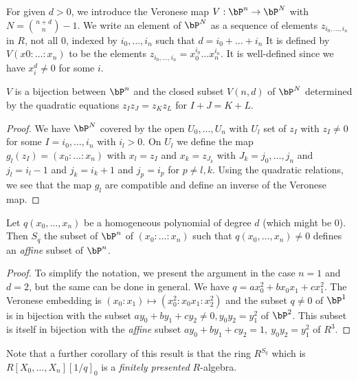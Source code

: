 For given $d>0$, we introduce the Veronese map $V: \bP^n\rightarrow \bP^N$ with $N = \binom{n+d}{n}-1$.
We write an element of $\bP^N$ as a sequence of elements $z_{i_0,\dots,i_n}$ in $R$, not all $0$,
indexed by $i_0,\dots,i_n$ such that $d = i_0+\dots+i_n$
It is defined by $V(x0:\dots:x_n)$ to be the elements $z_{i_0,\dots,i_n} = x_0^{i_0}\dots x_n^{i_n}$. It is well-defined
since we have $x_i^d\neq 0$ for some $i$.

\begin{proposition}\label{veronese}
  $V$ is a bijection between $\bP^n$ and the closed subset $V(n,d)$ of $\bP^N$ determined by the quadratic
  equations $z_Iz_J = z_Kz_L$ for $I+J=K+L$.
\end{proposition}

\begin{proof}
  We have $\bP^N$ covered by the open $U_0,\dots,U_n$ with $U_l$ set of $z_I$ with $z_I\neq 0$
  for some $I = i_0,\dots,i_n$ with $i_l>0$. On $U_l$ we define the map $g_l(z_I) = (x_0:\dots:x_n)$
  with $x_l = z_I$ and $x_k = z_{J_k}$ with $J_k = j_0,\dots,j_n$ and $j_l = i_l-1$ and $j_k = i_k+1$
  and $j_p = i_p$ for $p\neq l,k$. Using the quadratic relations, we see that the map $g_l$
  are compatible and define an inverse of the Veronese map.
\end{proof}

\begin{corollary}\label{affine}
  Let $q(x_0,\dots,x_n)$ be a homogeneous polynomial of degree $d$ (which might be $0$). Then $S_q$ the subset
  of $\bP^n$ of $(x_0:\dots:x_n)$ such that $q(x_0,\dots,x_n)\neq 0$
  defines an {\em affine} subset of $\bP^n$.
\end{corollary}

\begin{proof}
  To simplify the notation, we present the argument in the case $n=1$ and $d=2$, but the same can be done
  in general. We have $q = ax_0^2 + bx_0x_1+cx_1^2$. The Veronese embedding is $(x_0:x_1)\mapsto (x_0^2:x_0x_1:x_2^2)$
  and the subset $q\neq 0$ of $\bP^1$ is in bijection with the subset $ay_0+by_1+cy_2\neq 0, y_0y_2 = y_1^2$ of $\bP^2$.
  This subset is itself in bijection with the {\em affine} subset $ay_0+by_1+cy_2 = 1, ~y_0y_2=y_1^2$ of $R^3$.
\end{proof}

Note that a further corollary of this result is that the ring $R^{S_q}$ which is $R[X_0,\dots,X_n][1/q]_0$ is
a {\em finitely presented} $R$-algebra.
